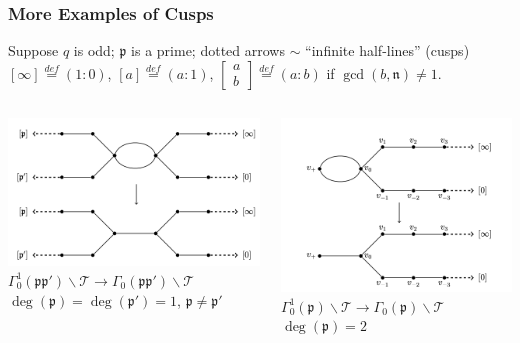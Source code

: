 \documentclass[handout]{beamer}
\numberwithin{equation}{section}
\numberwithin{case}{theorem}
\newcommand{\<}{\left\langle}
\renewcommand{\>}{\right\rangle}
\begin{document}
	\begin{frame}
		\frametitle{More Examples of Cusps}
		Suppose $q$ is odd; $\mathfrak{p}$ is a prime; dotted arrows $\sim$ ``infinite half-lines'' (cusps)\\
		$[\infty]\overset{def}{=}(1:0)$, $[a]\overset{def}{=}(a:1)$, $\begin{bmatrix} a\\ b\end{bmatrix}\overset{def}{=}(a:b)$ if $\gcd(b, \mathfrak{n})\neq 1$.
		\begin{columns}
			\begin{column}{.5\textwidth}
				\includegraphics[scale=0.5]{cover1.png}\\
				\cite[Figure $2$]{Franklin-Ho-Papikian-DrinfeldCurves-SL}
				$\Gamma_0^1(\mathfrak{p}\mathfrak{p}')\backslash \mathscr{T}\to \Gamma_0(\mathfrak{p}\mathfrak{p}')\backslash\mathscr{T}$\\ $\deg(\mathfrak{p})=\deg(\mathfrak{p}')=1$, $\mathfrak{p}\neq \mathfrak{p}'$
			\end{column}
			\begin{column}{.5\textwidth}
				\includegraphics[scale=0.5]{cover2.png}\\
				\cite[Figure $3$]{Franklin-Ho-Papikian-DrinfeldCurves-SL}
				$\Gamma_0^1(\mathfrak{p})\backslash \mathscr{T}\to\Gamma_0(\mathfrak{p})\backslash \mathscr{T}$\\
				$\deg(\mathfrak{p}) = 2$
			\end{column}
		\end{columns}
		

\end{frame}
\end{document}
